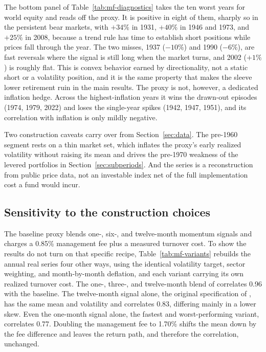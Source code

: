 \documentclass[11pt]{article}
\begin{document}
The bottom panel of Table~\ref{tab:mf-diagnostics} takes the ten worst years for
world equity and reads off the proxy. It is positive in eight of them, sharply
so in the persistent bear markets, with $+34\%$ in 1931, $+40\%$ in 1946 and
1973, and $+25\%$ in 2008, because a trend rule has time to establish short
positions while prices fall through the year. The two misses, 1937 ($-10\%$) and
1990 ($-6\%$), are fast reversals where the signal is still long when the market
turns, and 2002 ($+1\%$) is roughly flat. This is convex behavior earned by
directionality, not a static short or a volatility position, and it is the same
property that makes the sleeve lower retirement ruin in the main results. The
proxy is not, however, a dedicated inflation hedge. Across the highest-inflation
years it wins the drawn-out episodes (1974, 1979, 2022) and loses the
single-year spikes (1942, 1947, 1951), and its correlation with inflation is
only mildly negative.

Two construction caveats carry over from Section~\ref{sec:data}. The pre-1960
segment rests on a thin market set, which inflates the proxy's early realized
volatility without raising its mean and drives the pre-1970 weakness of the
levered portfolios in Section~\ref{sec:subperiods}. And the series is a
reconstruction from public price data, not an investable index net of the full
implementation cost a fund would incur.

\subsection{Sensitivity to the construction choices}
\label{app:mf-variants}

The baseline proxy blends one-, six-, and twelve-month momentum signals and
charges a 0.85\% management fee plus a measured turnover cost. To show the
results do not turn on that specific recipe,
Table~\ref{tab:mf-variants} rebuilds the annual real series four other ways,
using the identical volatility target, sector weighting, and month-by-month
deflation, and each variant carrying its own realized turnover cost. The
one-, three-, and twelve-month blend of \citet{HurstOoiPedersen2017} correlates
0.96 with the baseline. The twelve-month signal alone, the original
specification of \citet{MoskowitzOoiPedersen2012}, has the same mean and
volatility and correlates 0.83, differing mainly in a lower skew. Even the
one-month signal alone, the fastest and worst-performing variant, correlates
0.77. Doubling the management fee to 1.70\% shifts the mean down by the
fee difference and leaves the return path, and therefore the correlation,
unchanged.
\end{document}
